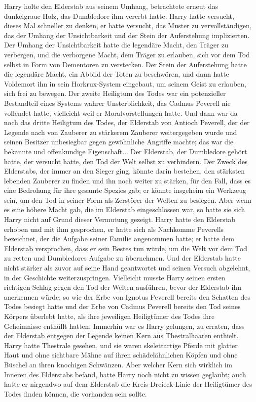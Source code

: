 Harry holte den Elderstab aus seinem Umhang, betrachtete erneut das dunkelgraue
Holz, das Dumbledore ihm vererbt hatte. Harry hatte versucht, dieses Mal
schneller zu denken, er hatte versucht, das Muster zu vervollständigen, das der
Umhang der Unsichtbarkeit und der Stein der Auferstehung implizierten. Der
Umhang der Unsichtbarkeit hatte die legendäre Macht, den Träger zu verbergen,
und die verborgene Macht, dem Träger zu erlauben, sich vor dem Tod selbst in
Form von Dementoren zu verstecken. Der Stein der Auferstehung hatte die
legendäre Macht, ein Abbild der Toten zu beschwören, und dann hatte Voldemort
ihn in sein Horkrux-System eingebaut, um seinem Geist zu erlauben, sich frei zu
bewegen. Der zweite Heiligtum des Todes war ein potenzieller Bestandteil eines
Systems wahrer Unsterblichkeit, das Cadmus Peverell nie vollendet hatte,
vielleicht weil er Moralvorstellungen hatte. Und dann war da noch das dritte
Heiligtum des Todes, der Elderstab von Antioch Peverell, der der Legende nach
von Zauberer zu stärkerem Zauberer weitergegeben wurde und seinen Besitzer
unbesiegbar gegen gewöhnliche Angriffe machte; das war die bekannte und
offenkundige Eigenschaft... Der Elderstab, der Dumbledore gehört hatte, der
versucht hatte, den Tod der Welt selbst zu verhindern. Der Zweck des Elderstabs,
der immer an den Sieger ging, könnte darin bestehen, den stärksten lebenden
Zauberer zu finden und ihn noch weiter zu stärken, für den Fall, dass es eine
Bedrohung für ihre gesamte Spezies gab; er könnte insgeheim ein Werkzeug sein,
um den Tod in seiner Form als Zerstörer der Welten zu besiegen. Aber wenn es
eine höhere Macht gab, die im Elderstab eingeschlossen war, so hatte sie sich
Harry nicht auf Grund dieser Vermutung gezeigt. Harry hatte den Elderstab
erhoben und mit ihm gesprochen, er hatte sich als Nachkomme Peverells
bezeichnet, der die Aufgabe seiner Familie angenommen hatte; er hatte dem
Elderstab versprochen, dass er sein Bestes tun würde, um die Welt vor dem Tod zu
retten und Dumbledores Aufgabe zu übernehmen. Und der Elderstab hatte nicht
stärker als zuvor auf seine Hand geantwortet und seinen Versuch abgelehnt, in
der Geschichte weiterzuspringen. Vielleicht musste Harry seinen ersten richtigen
Schlag gegen den Tod der Welten ausführen, bevor der Elderstab ihn anerkennen
würde; so wie der Erbe von Ignotus Peverell bereits den Schatten des Todes
besiegt hatte und der Erbe von Cadmus Peverell bereits den Tod seines Körpers
überlebt hatte, als ihre jeweiligen Heiligtümer des Todes ihre Geheimnisse
enthüllt hatten. Immerhin war es Harry gelungen, zu erraten, dass der Elderstab
entgegen der Legende keinen Kern aus \glqq{}Thestralhaaren\grqq{} enthielt. Harry
hatte Thestrale gesehen, und sie waren skelettartige Pferde mit glatter Haut und
ohne sichtbare Mähne auf ihren schädelähnlichen Köpfen und ohne Büschel an ihren
knochigen Schwänzen. Aber welcher Kern sich wirklich im Inneren des Elderstabs
befand, hatte Harry noch nicht zu wissen geglaubt; auch hatte er nirgendwo auf
dem Elderstab die Kreis-Dreieck-Linie der Heiligtümer des Todes finden können,
die vorhanden sein sollte.

